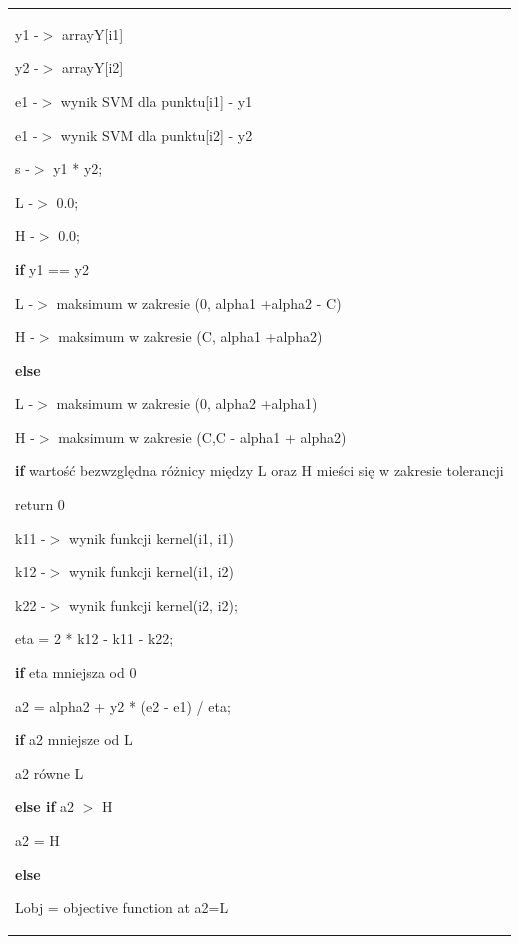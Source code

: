 \documentclass[[10pt,a4paper]{article}
\begin{document}
\begin{enumerate}
\begin{itemize}
\begin{tabular}{|p{11.5cm}|}
\noindent y1 -$>$ arrayY[i1]

\noindent y2 -$>$ arrayY[i2]

\noindent e1 -$>$ wynik SVM dla punktu[i1] - y1

\noindent e1 -$>$ wynik SVM dla punktu[i2] - y2

\noindent s -$>$ y1 * y2;

\noindent L -$>$ 0.0;

\noindent H -$>$ 0.0;

\noindent \textbf{if }y1 == y2

\hspace{1em} L -$>$ maksimum w zakresie (0, alpha1 +alpha2 - C)

\hspace{1em} H -$>$ maksimum w zakresie (C, alpha1 +alpha2)

\noindent \textbf{else }

 \hspace{1em}L -$>$ maksimum w zakresie (0, alpha2 +alpha1)

 \hspace{1em}H -$>$ maksimum w zakresie (C,C - alpha1 + alpha2)

\noindent \textbf{if} warto\'{s}\'{c} bezwzgl\k{e}dna różnicy między L oraz H mieści się w zakresie tolerancji

 \hspace{1em}return 0 

\noindent k11 -$>$ wynik funkcji kernel(i1, i1)

\noindent k12 -$>$ wynik funkcji kernel(i1, i2)

\noindent k22 -$>$ wynik funkcji kernel(i2, i2);

\noindent eta = 2 * k12 - k11 - k22;

\noindent \textbf{if }eta mniejsza od 0

 \hspace{1em}a2 = alpha2 + y2 * (e2 - e1) / eta;

 \hspace{1em}\textbf{if} a2 mniejsze od L

  \hspace{2em}a2 równe L

 \hspace{1em}\textbf{else if} a2 $>$ H

  \hspace{2em}a2 = H

\noindent \textbf{else}

 \hspace{1em}Lobj = objective function at a2=L


\end{tabular}
\end{itemize}
\end{enumerate}
\end{document}
